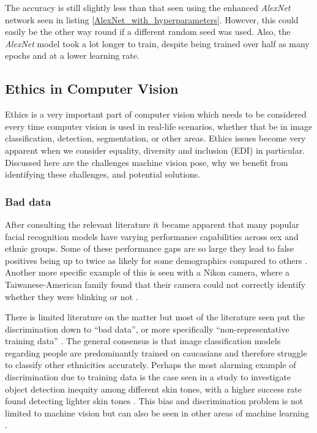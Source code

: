 \documentclass[11pt, letterpaper]{article}
\begin{document}
The accuracy is still slightly less than that seen using the enhanced \textit{AlexNet} network seen in listing \ref{AlexNet_with_hyperparameters}. However, this could easily be the other way round if a different random seed was used. Also, the \textit{AlexNet} model took a lot longer to train, despite being trained over half as many epochs and at a lower learning rate.

\clearpage
\subsection{Ethics in Computer Vision}
Ethics is a very important part of computer vision which needs to be considered every time computer vision is used in real-life scenarios, whether that be in image classification, detection, segmentation, or other areas. Ethics issues become very apparent when we consider equality, diversity and inclusion (EDI) in particular. Discussed here are the challenges machine vision pose, why we benefit from identifying these challenges, and potential solutions. 

\subsubsection*{Bad data}
After consulting the relevant literature it became apparent that many popular facial recognition models have varying performance capabilities across sex and ethnic groups. Some of these performance gaps are so large they lead to false positives being up to twice as likely for some demographics compared to others \cite{SernaImprovingFaceRepresentation}. Another more specific example of this is seen with a Nikon camera, where a Taiwanese-American family found that their camera could not correctly identify whether they were blinking or not \cite{NikonBlinkDetection}. 

There is limited literature on the matter but most of the literature seen put the discrimination down to ``bad data'', or more specifically ``non-representative training data'' \cite{BadDataMedium}. The general consensus is that image classification models regarding people are predominantly trained on caucasians and therefore struggle to classify other ethnicities accurately. Perhaps the most alarming example of discrimination due to training data is the case seen in a study to investigate object detection inequity among different skin tones, with a higher success rate found detecting lighter skin tones \cite{WilsonInequityObjectDetection}. This bias and discrimination problem is not limited to machine vision but can also be seen in other areas of machine learning \cite{BiasInMLHawaii}.
\end{document}
